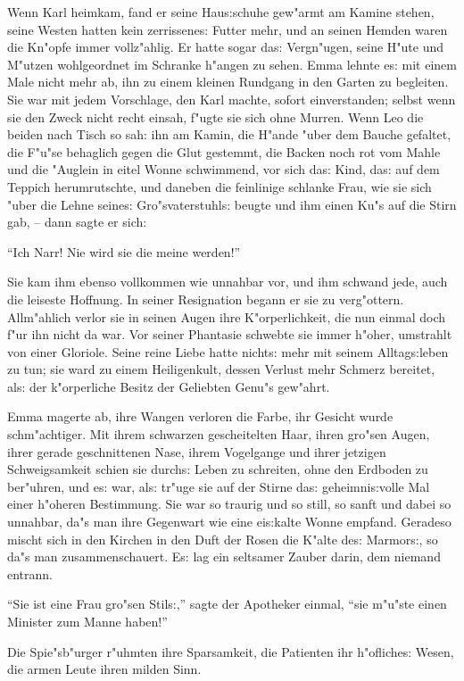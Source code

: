 \documentclass[oneside,12pt]{book}
\newcommand{\s}{s:}%
\begin{document}
Wenn Karl heimkam, fand er seine Hau{\s}schuhe gew"armt am Kamine
stehen, seine Westen hatten kein zerrissene{\s} Futter mehr, und
an seinen Hemden waren die Kn"opfe immer vollz"ahlig. Er hatte
sogar da{\s} Vergn"ugen, seine H"ute und M"utzen wohlgeordnet im
Schranke h"angen zu sehen. Emma lehnte e{\s} mit einem Male nicht
mehr ab, ihn zu einem kleinen Rundgang in den Garten zu begleiten.
Sie war mit jedem Vorschlage, den Karl machte, sofort
einverstanden; selbst wenn sie den Zweck nicht recht einsah,
f"ugte sie sich ohne Murren. Wenn Leo die beiden nach Tisch so
sah: ihn am Kamin, die H"ande "uber dem Bauche gefaltet, die
F"u"se behaglich gegen die Glut gestemmt, die Backen noch rot vom
Mahle und die "Auglein in eitel Wonne schwimmend, vor sich da{\s}
Kind, da{\s} auf dem Teppich herumrutschte, und daneben die
feinlinige schlanke Frau, wie sie sich "uber die Lehne seine{\s}
Gro"svaterstuhl{\s} beugte und ihm einen Ku"s auf die Stirn gab,
-- dann sagte er sich:

"`Ich Narr! Nie wird sie die meine werden!"'

Sie kam ihm ebenso vollkommen wie unnahbar vor, und ihm schwand
jede, auch die leiseste Hoffnung. In seiner Resignation begann er
sie zu verg"ottern. Allm"ahlich verlor sie in seinen Augen ihre
K"orperlichkeit, die nun einmal doch f"ur ihn nicht da war. Vor
seiner Phantasie schwebte sie immer h"oher, umstrahlt von einer
Gloriole. Seine reine Liebe hatte nicht{\s} mehr mit seinem
Alltag{\s}leben zu tun; sie ward zu einem Heiligenkult, dessen
Verlust mehr Schmerz bereitet, al{\s} der k"orperliche Besitz der
Geliebten Genu"s gew"ahrt.

Emma magerte ab, ihre Wangen verloren die Farbe, ihr Gesicht wurde
schm"achtiger. Mit ihrem schwarzen gescheitelten Haar, ihren
gro"sen Augen, ihrer gerade geschnittenen Nase, ihrem Vogelgange
und ihrer jetzigen Schweigsamkeit schien sie durch{\s} Leben zu
schreiten, ohne den Erdboden zu ber"uhren, und e{\s} war, al{\s}
tr"uge sie auf der Stirne da{\s} geheimni{\s}volle Mal einer
h"oheren Bestimmung. Sie war so traurig und so still, so sanft und
dabei so unnahbar, da"s man ihre Gegenwart wie eine ei{\s}kalte
Wonne empfand. Geradeso mischt sich in den Kirchen in den Duft der
Rosen die K"alte de{\s} Marmor{\s}, so da"s man zusammenschauert.
E{\s} lag ein seltsamer Zauber darin, dem niemand entrann.

"`Sie ist eine Frau gro"sen Stil{\s},"' sagte der Apotheker
einmal, "`sie m"u"ste einen Minister zum Manne haben!"'

Die Spie"sb"urger r"uhmten ihre Sparsamkeit, die Patienten ihr
h"ofliche{\s} Wesen, die armen Leute ihren milden Sinn.
\end{document}
